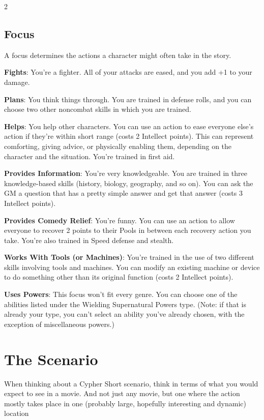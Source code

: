 \begin{multicols}{2}
\subsection{Focus}

A focus determines the actions a character might often take in the story.

\textbf{Fights}: You’re a fighter. All of your attacks are eased, and you add +1 to your damage.

\textbf{Plans}: You think things through. You are trained in defense rolls, and you can choose two other noncombat skills in which you are trained.

\textbf{Helps}: You help other characters. You can use an action to ease everyone else’s action if they’re within short range (costs 2 Intellect points). This can represent comforting, giving advice, or physically enabling them, depending on the character and the situation. You’re trained in first aid.

\textbf{Provides Information}: You’re very knowledgeable. You are trained in three knowledge-based skills (history, biology, geography, and so on). You can ask the GM a question that has a pretty simple answer and get that answer (costs 3 Intellect points).

\textbf{Provides Comedy Relief}: You’re funny. You can use an action to allow everyone to recover 2 points to their Pools in between each recovery action you take. You’re also trained in Speed defense and stealth.

\textbf{Works With Tools (or Machines)}: You’re trained in the use of two different skills involving tools and machines. You can modify an existing machine or device to do something other than its original function (costs 2 Intellect points).

\textbf{Uses Powers}: This focus won’t fit every genre. You can choose one of the abilities listed under the Wielding Supernatural Powers type. (Note: if that is already your type, you can’t select an ability you’ve already chosen, with the exception of miscellaneous powers.)

\section{The Scenario}

When thinking about a Cypher Short scenario, think in terms of what you would expect to see in a movie. And not just any movie, but one where the action mostly takes place in one (probably large, hopefully interesting and dynamic) location


\end{multicols}
